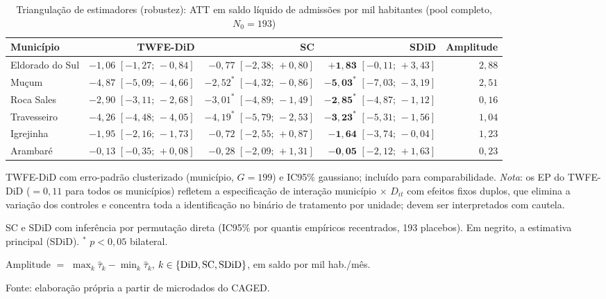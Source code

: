 \documentclass[a4paper,12pt]{article}
\begin{document}
\begin{table}[htbp]
\centering
\caption{Triangulação de estimadores (robustez): ATT em saldo líquido de admissões por
mil habitantes (pool completo, $N_0 = 193$)}
\label{tab:triangulacao_saldo}
\begin{threeparttable}
\small
\begin{tabular}{l r r r r}
\toprule
Município & TWFE-DiD\tnote{a} & SC\tnote{b} & SDiD\tnote{b} & Amplitude \\
\midrule
Eldorado do Sul
  & $-1{,}06$ $[-1{,}27;\,-0{,}84]$
  & $-0{,}77$ $[-2{,}38;\,+0{,}80]$
  & $\boldsymbol{+1{,}83}$ $[-0{,}11;\,+3{,}43]$
  & $2{,}88$ \\
Mu\c{c}um
  & $-4{,}87$ $[-5{,}09;\,-4{,}66]$
  & $-2{,}52^{*}$ $[-4{,}32;\,-0{,}86]$
  & $\boldsymbol{-5{,}03^{*}}$ $[-7{,}03;\,-3{,}19]$
  & $2{,}51$ \\
Roca Sales
  & $-2{,}90$ $[-3{,}11;\,-2{,}68]$
  & $-3{,}01^{*}$ $[-4{,}89;\,-1{,}49]$
  & $\boldsymbol{-2{,}85^{*}}$ $[-4{,}87;\,-1{,}12]$
  & $0{,}16$ \\
Travesseiro
  & $-4{,}26$ $[-4{,}48;\,-4{,}05]$
  & $-4{,}19^{*}$ $[-5{,}79;\,-2{,}53]$
  & $\boldsymbol{-3{,}23^{*}}$ $[-5{,}31;\,-1{,}56]$
  & $1{,}04$ \\
Igrejinha
  & $-1{,}95$ $[-2{,}16;\,-1{,}73]$
  & $-0{,}72$ $[-2{,}55;\,+0{,}87]$
  & $\boldsymbol{-1{,}64}$ $[-3{,}74;\,-0{,}04]$
  & $1{,}23$ \\
Arambaré
  & $-0{,}13$ $[-0{,}35;\,+0{,}08]$
  & $-0{,}28$ $[-2{,}09;\,+1{,}31]$
  & $\boldsymbol{-0{,}05}$ $[-2{,}12;\,+1{,}63]$
  & $0{,}23$ \\
\bottomrule
\end{tabular}
\begin{tablenotes}[flushleft]
\footnotesize
\item[a] TWFE-DiD com erro-padrão clusterizado (município, $G = 199$) e IC95\%
  gaussiano; incluído para comparabilidade. \emph{Nota}: os EP do TWFE-DiD
  ($= 0{,}11$ para todos os municípios) refletem a especificação de interação
  município$\,\times\,D_{it}$ com efeitos fixos duplos, que elimina a variação
  dos controles e concentra toda a identificação no binário de tratamento
  por unidade; devem ser interpretados com cautela.
\item[b] SC e SDiD com inferência por permutação direta (IC95\% por quantis
  empíricos recentrados, 193 placebos). Em negrito, a estimativa principal
  (SDiD). $^{*}$ $p < 0{,}05$ bilateral.
\item Amplitude $=$ $\max_k \hat{\tau}_k - \min_k \hat{\tau}_k$,
  $k \in \{\text{DiD,\,SC,\,SDiD}\}$, em saldo por mil hab./mês.
\item Fonte: elaboração própria a partir de microdados do CAGED.
\end{tablenotes}
\end{threeparttable}
\end{table}
\end{document}
